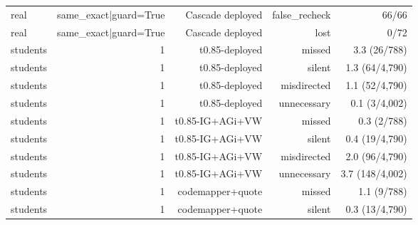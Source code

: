 \begin{table}[t]
{\begin{tabular}{@{}lrrrr@{}}
real & same\_exact|guard=True & Cascade deployed & false\_recheck & 66/66 \\
real & same\_exact|guard=True & Cascade deployed & lost & 0/72 \\
students & 1 & t0.85-deployed & missed & 3.3 (26/788) \\
students & 1 & t0.85-deployed & silent & 1.3 (64/4,790) \\
students & 1 & t0.85-deployed & misdirected & 1.1 (52/4,790) \\
students & 1 & t0.85-deployed & unnecessary & 0.1 (3/4,002) \\
students & 1 & t0.85-IG+AGi+VW & missed & 0.3 (2/788) \\
students & 1 & t0.85-IG+AGi+VW & silent & 0.4 (19/4,790) \\
students & 1 & t0.85-IG+AGi+VW & misdirected & 2.0 (96/4,790) \\
students & 1 & t0.85-IG+AGi+VW & unnecessary & 3.7 (148/4,002) \\
students & 1 & codemapper+quote & missed & 1.1 (9/788) \\
students & 1 & codemapper+quote & silent & 0.3 (13/4,790) \\
\bottomrule
\end{tabular}
}
\end{table}


